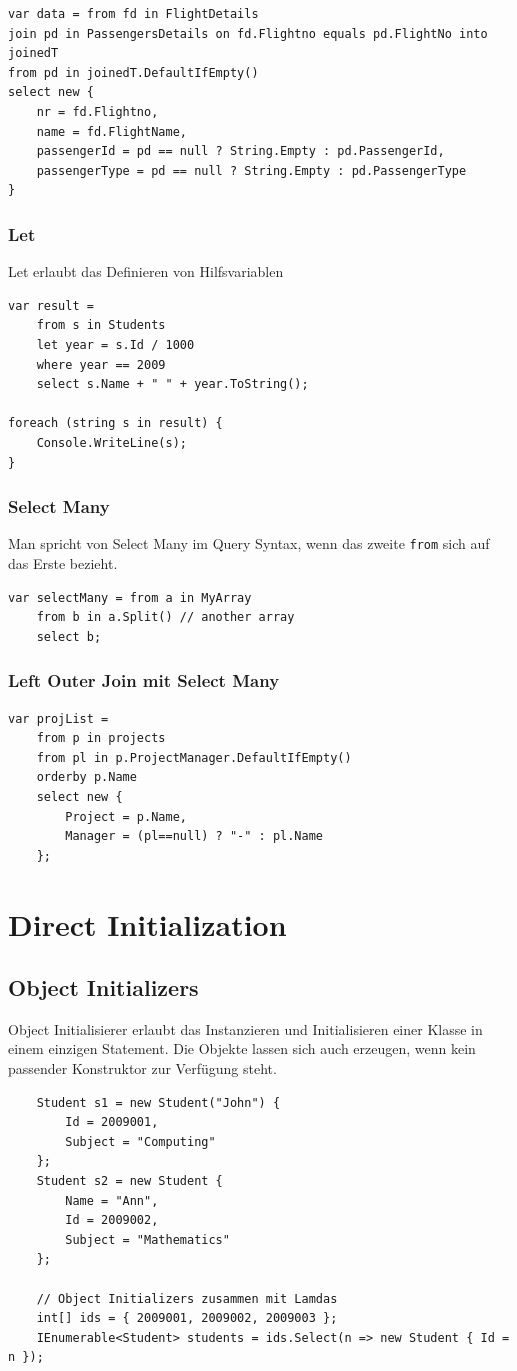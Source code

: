 \begin{lstlisting}
var data = from fd in FlightDetails
join pd in PassengersDetails on fd.Flightno equals pd.FlightNo into joinedT
from pd in joinedT.DefaultIfEmpty()
select new {
	nr = fd.Flightno,
	name = fd.FlightName,
	passengerId = pd == null ? String.Empty : pd.PassengerId,
	passengerType = pd == null ? String.Empty : pd.PassengerType
}
\end{lstlisting}

\clearpage

\subsubsection{Let}
Let erlaubt das Definieren von Hilfsvariablen
\begin{lstlisting}
var result =
	from s in Students
	let year = s.Id / 1000
	where year == 2009
	select s.Name + " " + year.ToString();

foreach (string s in result) {
	Console.WriteLine(s);
}
\end{lstlisting}


\subsubsection{Select Many}
Man spricht von Select Many im Query Syntax, wenn das zweite \lstinline|from| sich auf das Erste bezieht.
\begin{lstlisting}
var selectMany = from a in MyArray
	from b in a.Split() // another array
	select b;
\end{lstlisting}

\subsubsection{Left Outer Join mit Select Many}
\begin{lstlisting}
var projList = 
	from p in projects
	from pl in p.ProjectManager.DefaultIfEmpty()
	orderby p.Name
	select new { 
		Project = p.Name,
		Manager = (pl==null) ? "-" : pl.Name 
	};
\end{lstlisting}


\section{Direct Initialization}
\subsection{Object Initializers}
Object Initialisierer erlaubt das Instanzieren und Initialisieren einer Klasse in einem einzigen Statement. Die Objekte lassen sich auch erzeugen, wenn kein passender Konstruktor zur Verfügung steht.
\begin{lstlisting}
	Student s1 = new Student("John") {
		Id = 2009001,
		Subject = "Computing"
	};
	Student s2 = new Student {
		Name = "Ann",
		Id = 2009002,
		Subject = "Mathematics"
	};
	
	// Object Initializers zusammen mit Lamdas
	int[] ids = { 2009001, 2009002, 2009003 };
	IEnumerable<Student> students = ids.Select(n => new Student { Id = n });
\end{lstlisting}

